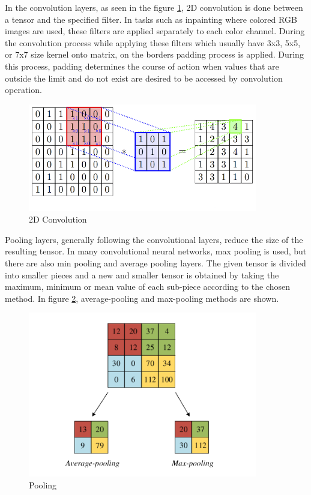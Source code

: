 In the convolution layers, as seen in the figure \ref{fig:convolution}, 2D convolution is done between a tensor and the specified filter. In tasks such as inpainting where colored RGB images are used, these filters are applied separately to each color channel. During the convolution process while applying these filters which usually have 3x3, 5x5, or 7x7 size kernel onto matrix, on the borders padding process is applied. During this process, padding determines the course of action when values that are outside the limit and do not exist are desired to be accessed by convolution operation.

\begin{figure}[h!]
    \centering
    \includegraphics[width=10cm]{figures/chapter3/convolution.png}
    \caption{2D Convolution \cite{convolution_pooling}}
    \label{fig:convolution}
\end{figure}

Pooling layers, generally following the convolutional layers, reduce the size of the resulting tensor. In many convolutional neural networks, max pooling is used, but there are also min pooling and average pooling layers. The given tensor is divided into smaller pieces and a new and smaller tensor is obtained by taking the maximum, minimum or mean value of each sub-piece according to the chosen method. In figure \ref{fig:pooling}, average-pooling and max-pooling methods are shown.

\begin{figure}[h!]
    \centering
    \includegraphics[width=10cm]{figures/chapter3/pooling.png}
    \caption{Pooling \cite{convolution_pooling}}
    \label{fig:pooling}
\end{figure}

